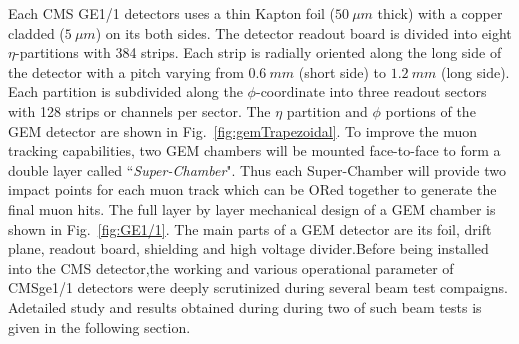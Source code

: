 Each CMS GE1/1 detectors uses a thin Kapton foil ($50~\mu m$ thick) with a copper cladded ($5~\mu m$) on its both sides.
The detector readout board is divided into eight $\eta$-partitions with 384 strips.
Each strip is radially oriented along the long side of the detector with a pitch varying from $0.6~mm$ (short side) to $1.2~mm$ (long side).
Each partition is subdivided along the $\phi$-coordinate into three readout sectors with 128 strips or channels per sector. The $\eta$ partition and $\phi$ portions of the GEM detector are shown in Fig.~\ref{fig:gemTrapezoidal}. 
To improve the muon tracking capabilities, two GEM chambers will be mounted face-to-face to form a double layer called ``\textit{Super-Chamber}".
Thus each Super-Chamber will provide two impact points for each muon track which can be ORed together to generate the final muon hits.
The full layer by layer mechanical design of a GEM chamber is shown in Fig.~\ref{fig:GE1/1}. 
The main parts of a GEM detector are its foil, drift plane, readout board, shielding and high voltage divider.Before being installed into the CMS detector,the working and various operational parameter of CMSge1/1 detectors were deeply scrutinized during several beam test compaigns.
Adetailed study and results obtained during during two of such beam tests is given in the following section.
